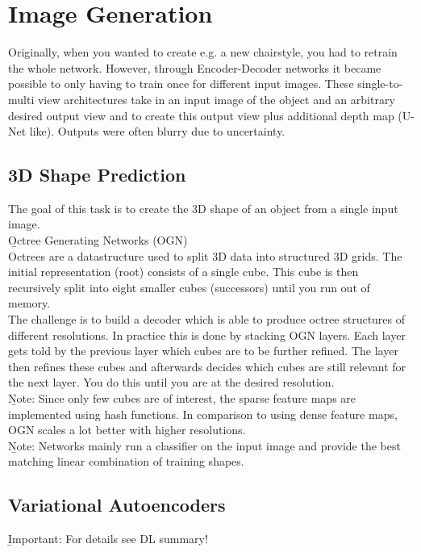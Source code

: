 \section{Image Generation}
Originally, when you wanted to create e.g. a new chairstyle, you had to retrain the whole network. However, through Encoder-Decoder networks it became possible to only having to train once for different input images. These single-to-multi view architectures take in an input image of the object and an arbitrary desired output view and to create this output view plus additional depth map (U-Net like). Outputs were often blurry due to uncertainty.

\subsection{3D Shape Prediction}
The goal of this task is to create the 3D shape of an object from a single input image.\\

\b{Octree Generating Networks (OGN)\\[.5em]}
Octrees are a datastructure used to split 3D data into structured 3D grids. The initial representation (root) consists of a single cube. This cube is then recursively split into eight smaller cubes (successors) until you run out of memory.\\

The challenge is to build a decoder which is able to produce octree structures of different resolutions. In practice this is done by stacking OGN layers. Each layer gets told by the previous layer which cubes are to be further refined. The layer then refines these cubes and afterwards decides which cubes are still relevant for the next layer. You do this until you are at the desired resolution.\\

\b{Note:} Since only few cubes are of interest, the sparse feature maps are implemented using hash functions. In comparison to using dense feature maps, OGN scales a lot better with higher resolutions.\\

\b{Note:} Networks mainly run a classifier on the input image and provide the best matching linear combination of training shapes.

\subsection{Variational Autoencoders}
\b{Important:} For details see DL summary!\\

